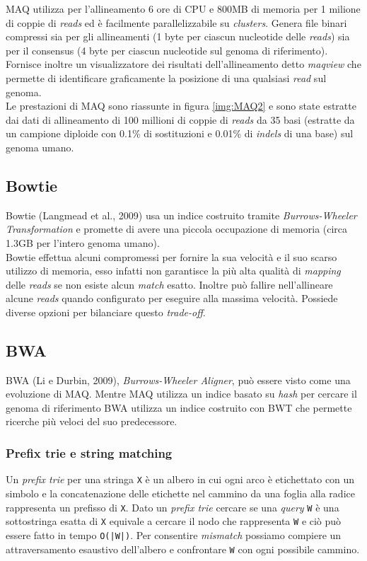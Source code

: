 \documentclass[conference]{IEEEtran}
\begin{document}
MAQ utilizza per l'allineamento 6 ore di CPU e 800MB di memoria per 1 milione di coppie di \textit{reads} ed è facilmente parallelizzabile su \textit{clusters}. Genera file binari compressi sia per gli allineamenti (1 byte per ciascun nucleotide delle \textit{reads}) sia per il consensus (4 byte per ciascun nucleotide sul genoma di riferimento). Fornisce inoltre un visualizzatore dei risultati dell'allineamento detto \textit{maqview} che permette di identificare graficamente la posizione di una qualsiasi \textit{read} sul genoma.\\

Le prestazioni di MAQ sono riassunte in figura \ref{img:MAQ2} e sono state estratte dai dati di allineamento di 100 millioni di coppie di \textit{reads} da 35 basi (estratte da un campione diploide con 0.1\% di sostituzioni e 0.01\% di \textit{indels} di una base) sul genoma umano.

	\subsection{Bowtie}
Bowtie (Langmead et al., 2009) usa un indice costruito tramite \textit{Burrows-Wheeler Transformation} e promette di avere una piccola occupazione di memoria (circa 1.3GB per l'intero genoma umano).\\

Bowtie effettua alcuni compromessi per fornire la sua velocità e il suo scarso utilizzo di memoria, esso infatti non garantisce la più alta qualità di \textit{mapping} delle \textit{reads} se non esiste alcun \textit{match} esatto. Inoltre può fallire nell'allineare alcune \textit{reads} quando configurato per eseguire alla massima velocità. Possiede diverse opzioni per bilanciare questo \textit{trade-off}.

	\subsection{BWA}
	BWA (Li e Durbin, 2009), \textit{Burrows-Wheeler Aligner}, può essere visto come una evoluzione di MAQ. Mentre MAQ utilizza un indice basato su \textit{hash} per cercare il genoma di riferimento BWA utilizza un indice costruito con BWT che permette ricerche più veloci del suo predecessore.\\

		\subsubsection{Prefix trie e string matching}
		Un \textit{prefix trie} per una stringa \texttt{X} è un albero in cui ogni arco è etichettato con un simbolo e la concatenazione delle etichette nel cammino da una foglia alla radice rappresenta un prefisso di \texttt{X}. Dato un \textit{prefix trie} cercare se una \textit{query} \texttt{W} è una sottostringa esatta di \texttt{X} equivale a cercare il nodo che rappresenta \texttt{W} e ciò può essere fatto in tempo \texttt{O(|W|)}. Per consentire \textit{mismatch} possiamo compiere un attraversamento esaustivo dell'albero e confrontare \texttt{W} con ogni possibile cammino.\\
\end{document}
